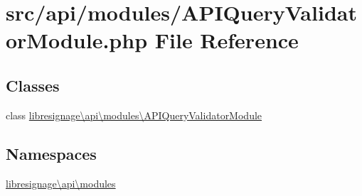 \hypertarget{APIQueryValidatorModule_8php}{}\section{src/api/modules/\+A\+P\+I\+Query\+Validator\+Module.php File Reference}
\label{APIQueryValidatorModule_8php}
\subsection*{Classes}
\begin{DoxyCompactItemize}
\item 
class \hyperlink{classlibresignage_1_1api_1_1modules_1_1APIQueryValidatorModule}{libresignage\textbackslash{}api\textbackslash{}modules\textbackslash{}\+A\+P\+I\+Query\+Validator\+Module}
\end{DoxyCompactItemize}
\subsection*{Namespaces}
\begin{DoxyCompactItemize}
\item 
 \hyperlink{namespacelibresignage_1_1api_1_1modules}{libresignage\textbackslash{}api\textbackslash{}modules}
\end{DoxyCompactItemize}
